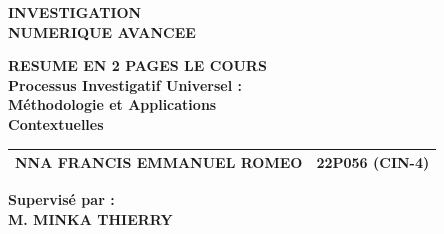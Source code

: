 \documentclass[11pt, a4paper]{article}
\begin{document}
\begin{tcolorbox}[
  enhanced,
  colback=white,
  colframe=orange,
  arc=6pt,
  boxrule=1.8pt,
  left=10pt, right=10pt, top=8pt, bottom=8pt,
  width=0.82\textwidth,
  center
]
  \begin{center}
    {\fontsize{28}{32}\selectfont\bfseries INVESTIGATION}\\[4pt]
    {\fontsize{28}{32}\selectfont\bfseries NUMERIQUE AVANCEE}
  \end{center}
\end{tcolorbox}

\vspace{1cm}

\begin{center}
  {\large\bfseries RESUME EN 2 PAGES LE COURS}\\[6pt]
  {\large\bfseries Processus Investigatif Universel :}\\[4pt]
  {\large\bfseries M\'{e}thodologie et Applications}\\[4pt]
  {\large\bfseries Contextuelles}
\end{center}

\vspace{1.2cm}

\begin{center}
\begin{tabular}{|l|l|}
  \hline
  \textbf{NNA FRANCIS EMMANUEL ROMEO} & \textbf{22P056 (CIN-4)} \\
  \hline
\end{tabular}
\end{center}

\vspace{1.4cm}

\begin{center}
  {\Large\bfseries Supervis\'{e} par :}\\[10pt]
  {\Large\bfseries M. MINKA THIERRY}
\end{center}

\vspace{1.6cm}
\end{document}
